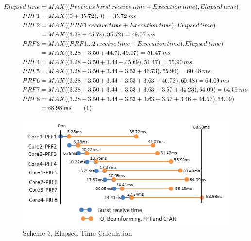 \begin{align*}
	Elapsed \: time &= MAX((Previous \: burst \: receive \: time + Execution \: time), Elapsed \: time)\\
	PRF1 &= MAX((0 + 35.72), 0) = 35.72 \: ms\\
	PRF2 &= MAX((PRF1 \: receive \: time + Execution \: time), Elapsed \: time) \\
		&= MAX((3.28 + 45.78), 35.72) = 49.07 \: ms \\	 
	PRF3 &= MAX((PRF1...2 \: receive \: time + Execution \: time), Elapsed \: time) \\	
		&= MAX((3.28 + 3.50 + 44.7),49.07) = 51.47 \: ms \\
	PRF4 &= MAX((3.28 + 3.50 + 3.44 + 45.69), 51.47) = 55.90 \: ms \\
	PRF5 &= MAX((3.28 + 3.50 + 3.44 + 3.53 + 46.73), 55.90) = 60.48 \: ms \\
	PRF6 &= MAX((3.28 + 3.50 + 3.44 + 3.53 + 3.63 + 46.72), 60.48) = 64.09 \: ms \\ 
	PRF7 &= MAX((3.28 + 3.50 + 3.44 + 3.53 + 3.63 + 3.57 + 34.23), 64.09) = 64.09 \: ms \\	
	PRF8 &= MAX((3.28 + 3.50 + 3.44 + 3.53 + 3.63 + 3.57 + 3.46 + 44.57), 64.09) \\
		&= 68.98 \: ms	\stepcounter{equation}\tag{\theequation}
\end{align*}

\begin{figure}[h!]
	\centering
	\includegraphics[width=130mm]{figures/scheme4_timeline_burst_proc}
	\caption{Scheme-3, Elapsed Time Calculation}
	\label{fig:mm:scheme4_timeline_burst_proc}
\end{figure}

